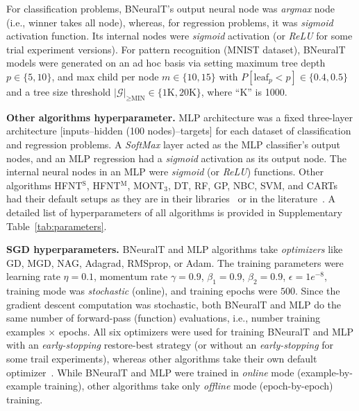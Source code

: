 \documentclass[11pt,a4paper]{article}
\begin{document}
    For classification problems, BNeuralT's output neural node was \textit{argmax} node (i.e., winner takes all node), whereas, for regression problems, it was \textit{sigmoid} activation function. Its internal nodes were \textit{sigmoid} activation (or \textit{ReLU} for some trial experiment versions). 
For pattern recognition (MNIST dataset), BNeuralT models were generated on an ad hoc basis via setting maximum tree depth $ p \in \{5, 10\}$, and max child per node $ m \in \{10, 15\}$ with  $ P[\text{leaf}_{p} < p]  \in \{0.4, 0.5\}$ and a tree size threshold $ |\mathcal{G}|_{\ge \text{MIN}} \in \{1\text{K}, 20\text{K} \}$, where ``K'' is 1000. 
    
    \textbf{Other algorithms hyperparameter.}
    MLP architecture was a fixed three-layer architecture [inputs--hidden (100 nodes)--targets] for each dataset of classification and regression problems. A \textit{SoftMax} layer acted as the MLP classifier's output nodes, and an MLP regression had a \textit{sigmoid} activation as its output node. The internal neural nodes in an MLP were \textit{sigmoid} (or \textit{ReLU}) functions. Other algorithms HFNT$^{\text{S}}$, HFNT$^{\text{M}}$, MONT$_3$, DT, RF, GP, NBC, SVM, and CARTs had their default setups as they are in their libraries~\citep{pedregosa2011scikit} or in the literature~\citep{ojha2017ensemble,ojha2020multi,zharmagambetov2019experimental}. A detailed list of hyperparameters of all algorithms is provided in Supplementary Table~\ref{tab:parameters}. 
    

    
    \textbf{SGD hyperparameters.} BNeuralT and MLP algorithms take \textit{optimizers} like GD, MGD, NAG,  Adagrad, RMSprop, or Adam. The training parameters were learning rate $ \eta = 0.1$, momentum rate $ \gamma = 0.9$, $ \beta_1 = 0.9 $, $ \beta_2 = 0.9 $, $\epsilon = 1e^{-8}$, training mode was \textit{stochastic} (online), and training epochs were $500.$ Since the gradient descent computation was stochastic, both BNeuralT and MLP do the same number of forward-pass (function) evaluations, i.e., number training examples $\times$ epochs. All six optimizers were used for training BNeuralT and MLP with an \textit{early-stopping} restore-best strategy (or without an \textit{early-stopping} for some trail experiments), whereas other algorithms take their own default optimizer~\citep{pedregosa2011scikit}. While BNeuralT and MLP were trained in \textit{online} mode (example-by-example training), other algorithms take only \textit{offline} mode (epoch-by-epoch) training. 
    
\end{document}
